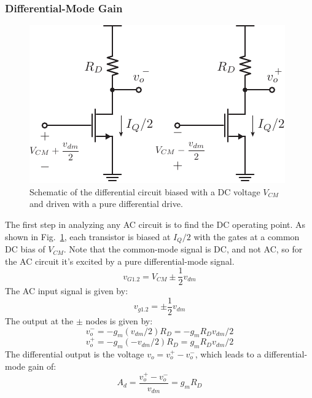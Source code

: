 \subsubsection{Differential-Mode Gain}
\begin{figure}[tb]
\centering
\includegraphics[scale=1]{Diff_ss_gain.pdf}
\caption{Schematic of the differential circuit biased with a DC voltage $V_{CM}$ and driven with a pure differential drive.}
\label{fig:Diff_ss_gain.pdf}
\end{figure}
The first step in analyzing any AC circuit is to find the DC operating point.  As shown in Fig.~\ref{fig:Diff_ss_gain.pdf}, each transistor is biased at $I_Q/2$ with the gates at a common DC bias of $V_{CM}$.  Note that the common-mode signal is DC, and not AC, so for the AC circuit it's excited by a pure differential-mode signal.
    \begin{equation}
        {v_{G1.2}} = {V_{CM}} \pm \frac{1}{2}{v_{dm}}
    \end{equation}
The AC input signal is given by:
    \begin{equation}
        {v_{g1.2}} = \pm \frac{1}{2}{v_{dm}}
    \end{equation}
The output at the $\pm$ nodes is given by:
    \begin{equation}
        {v_{o}^-} = - {g_m}({v_{dm}}/2){R_D} =  - {g_m}{R_D}{v_{dm}}/2
    \end{equation}
    \begin{equation} 
        {v_{o}^+} = - {g_m}( - {v_{dm}}/2){R_D} = {g_m}{R_D}{v_{dm}}/2 
    \end{equation}
The differential output is the voltage $v_o = v_o^+ - v_o^-$, which leads to a differential-mode gain of:
    \begin{equation} 
        {A_d} = \frac{{{v_{o}^+} - {v_{o}^-}}}{{{v_{dm}}}} = {g_m}{R_D}
    \end{equation}
